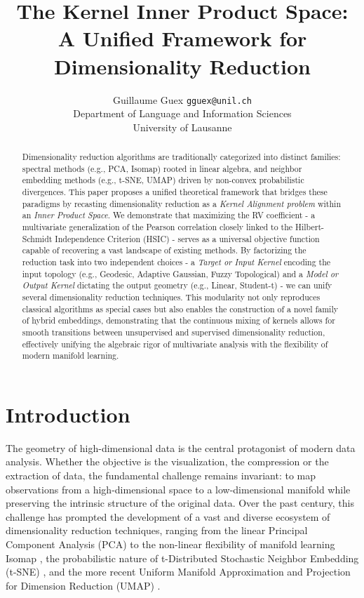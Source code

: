 \documentclass[11pt]{article}
\title{The Kernel Inner Product Space: A Unified Framework for Dimensionality Reduction}
\author{Guillaume Guex \texttt{gguex@unil.ch} \\
	Department of Language and Information Sciences \\ 
	University of Lausanne}
\begin{document}
	
	\maketitle
	
	\begin{abstract}
		Dimensionality reduction algorithms are traditionally categorized into distinct families: spectral methods (e.g., PCA, Isomap) rooted in linear algebra, and neighbor embedding methods (e.g., t-SNE, UMAP) driven by non-convex probabilistic divergences. This paper proposes a unified theoretical framework that bridges these paradigms by recasting dimensionality reduction as a \textit{Kernel Alignment problem} within an \textit{Inner Product Space}. We demonstrate that maximizing the RV coefficient - a multivariate generalization of the Pearson correlation closely linked to the Hilbert-Schmidt Independence Criterion (HSIC) - serves as a universal objective function capable of recovering a vast landscape of existing methods. By factorizing the reduction task into two independent choices - a \textit{Target or Input Kernel} encoding the input topology (e.g., Geodesic, Adaptive Gaussian, Fuzzy Topological) and a \textit{Model or Output Kernel} dictating the output geometry (e.g., Linear, Student-t) - we can unify several dimensionality reduction techniques. This modularity not only reproduces classical algorithms as special cases but also enables the construction of a novel family of hybrid embeddings, demonstrating that the continuous mixing of kernels allows for smooth transitions between unsupervised and supervised dimensionality reduction, effectively unifying the algebraic rigor of multivariate analysis with the flexibility of modern manifold learning.
	\end{abstract}
	
	
	\section{Introduction}
	\label{section:introduction}
	
	The geometry of high-dimensional data is the central protagonist of modern data analysis. Whether the objective is the visualization, the compression or the extraction of data, the fundamental challenge remains invariant: to map observations from a high-dimensional space to a low-dimensional manifold while preserving the intrinsic structure of the original data. Over the past century, this challenge has prompted the development of a vast and diverse ecosystem of dimensionality reduction techniques, ranging from the linear Principal Component Analysis (PCA) \citep{pearson_principal_1901} to the non-linear flexibility of manifold learning Isomap \citep{tenenbaum_global_2000}, the probabilistic nature of t-Distributed Stochastic Neighbor Embedding (t-SNE) \citep{maaten_visualizing_2008}, and the more recent Uniform Manifold Approximation and Projection for Dimension Reduction (UMAP) \citep{mcinnes_umap_2020}.
	
\end{document}
